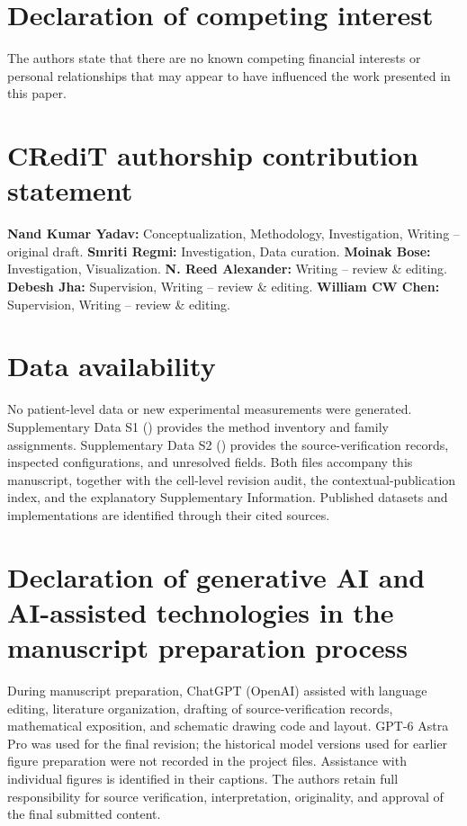 \documentclass[5p,times,authoryear]{elsarticle}
\begin{document}
\section*{Declaration of competing interest}
The authors state that there are no known competing financial interests or personal relationships that may appear to have influenced the work presented in this paper.

\section*{CRediT authorship contribution statement}
 \textbf{Nand Kumar Yadav:} Conceptualization, Methodology, Investigation, Writing -- original draft. \textbf{Smriti Regmi:} Investigation, Data curation. \textbf{Moinak Bose:} Investigation, Visualization. \textbf{N. Reed Alexander:} Writing -- review \& editing. \textbf{Debesh Jha:} Supervision, Writing -- review \& editing. \textbf{William CW Chen:} Supervision, Writing -- review \& editing.

\section*{Data availability}
No patient-level data or new experimental measurements were generated. Supplementary Data S1 () provides the method inventory and family assignments. Supplementary Data S2 () provides the source-verification records, inspected configurations, and unresolved fields. Both files accompany this manuscript, together with the cell-level revision audit, the contextual-publication index, and the explanatory Supplementary Information. Published datasets and implementations are identified through their cited sources.

\section*{Declaration of generative AI and AI-assisted technologies in the manuscript preparation process}
During manuscript preparation, ChatGPT (OpenAI) assisted with language editing, literature organization, drafting of source-verification records, mathematical exposition, and schematic drawing code and layout. GPT-6 Astra Pro was used for the final revision; the historical model versions used for earlier figure preparation were not recorded in the project files. Assistance with individual figures is identified in their captions. The authors retain full responsibility for source verification, interpretation, originality, and approval of the final submitted content.
\end{document}
